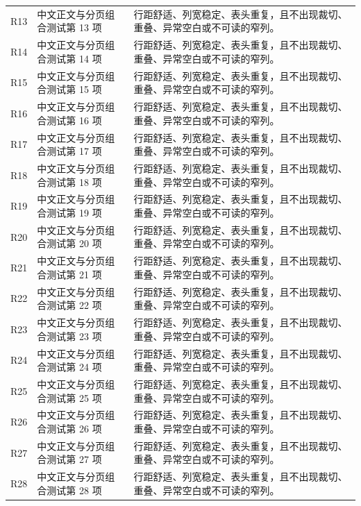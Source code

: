 \begin{longtable}{@{}p{.13\linewidth}p{.36\linewidth}p{.39\linewidth}@{}}
R13 & 中文正文与分页组合测试第 13 项 & 行距舒适、列宽稳定、表头重复，且不出现裁切、重叠、异常空白或不可读的窄列。\\
R14 & 中文正文与分页组合测试第 14 项 & 行距舒适、列宽稳定、表头重复，且不出现裁切、重叠、异常空白或不可读的窄列。\\
R15 & 中文正文与分页组合测试第 15 项 & 行距舒适、列宽稳定、表头重复，且不出现裁切、重叠、异常空白或不可读的窄列。\\
R16 & 中文正文与分页组合测试第 16 项 & 行距舒适、列宽稳定、表头重复，且不出现裁切、重叠、异常空白或不可读的窄列。\\
R17 & 中文正文与分页组合测试第 17 项 & 行距舒适、列宽稳定、表头重复，且不出现裁切、重叠、异常空白或不可读的窄列。\\
R18 & 中文正文与分页组合测试第 18 项 & 行距舒适、列宽稳定、表头重复，且不出现裁切、重叠、异常空白或不可读的窄列。\\
R19 & 中文正文与分页组合测试第 19 项 & 行距舒适、列宽稳定、表头重复，且不出现裁切、重叠、异常空白或不可读的窄列。\\
R20 & 中文正文与分页组合测试第 20 项 & 行距舒适、列宽稳定、表头重复，且不出现裁切、重叠、异常空白或不可读的窄列。\\
R21 & 中文正文与分页组合测试第 21 项 & 行距舒适、列宽稳定、表头重复，且不出现裁切、重叠、异常空白或不可读的窄列。\\
R22 & 中文正文与分页组合测试第 22 项 & 行距舒适、列宽稳定、表头重复，且不出现裁切、重叠、异常空白或不可读的窄列。\\
R23 & 中文正文与分页组合测试第 23 项 & 行距舒适、列宽稳定、表头重复，且不出现裁切、重叠、异常空白或不可读的窄列。\\
R24 & 中文正文与分页组合测试第 24 项 & 行距舒适、列宽稳定、表头重复，且不出现裁切、重叠、异常空白或不可读的窄列。\\
R25 & 中文正文与分页组合测试第 25 项 & 行距舒适、列宽稳定、表头重复，且不出现裁切、重叠、异常空白或不可读的窄列。\\
R26 & 中文正文与分页组合测试第 26 项 & 行距舒适、列宽稳定、表头重复，且不出现裁切、重叠、异常空白或不可读的窄列。\\
R27 & 中文正文与分页组合测试第 27 项 & 行距舒适、列宽稳定、表头重复，且不出现裁切、重叠、异常空白或不可读的窄列。\\
R28 & 中文正文与分页组合测试第 28 项 & 行距舒适、列宽稳定、表头重复，且不出现裁切、重叠、异常空白或不可读的窄列。\\
\end{longtable}
\normalsize

